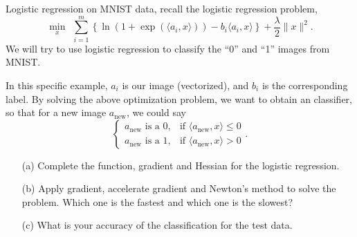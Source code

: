\documentclass[10pt]{article}
\begin{document}
\begin{problem}[Problem 6]
Logistic regression on MNIST data, recall the logistic regression problem,
\[
\min_{x}~~\sum_{i=1}^m \left\{\ln(1 + \exp(\langle a_i, x \rangle)) - b_i \langle a_i, x \rangle \right\} + \frac{\lambda}{2}\|x\|^2.
\]
We will try to use logistic regression to classify the ``0'' and ``1'' images from MNIST.

In this specific example, \( a_i \) is our image (vectorized), and \( b_i \) is the corresponding label.
By solving the above optimization problem, we want to obtain an classifier, so that for a new image \( a_\text{new} \), we could say
\[\begin{cases}
a_\text{new} \text{ is a 0}, &\text{if } \langle a_\text{new}, x \rangle \le 0\\
a_\text{new} \text{ is a 1}, &\text{if } \langle a_\text{new}, x \rangle > 0
\end{cases}.\]

\begin{enumerate}[label=(\alph*)]
\item[(a)] Complete the function, gradient and Hessian for the logistic regression.
\item[(b)] Apply gradient, accelerate gradient and Newton's method to solve the problem. Which one is the fastest and which one is the slowest?
\item[(c)] What is your accuracy of the classification for the test data.
\end{enumerate}
\end{problem}
\end{document}
